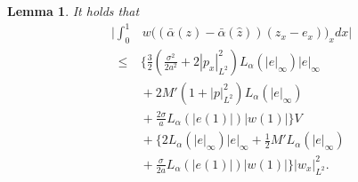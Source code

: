 \documentclass[twocolumn]{autart}
\newtheorem{lemm}{Lemma}
\newenvironment{lemma}{\begin{lemm}}{\hfill \end{lemm}}
\begin{document}
\begin{lemma}
It holds that 
\begin{align}
\bigg|\int_{0}^{1}&w\big(\left(\bar{\alpha}(z)-\bar{\alpha}(\hat{z})\right)(z_x-e_x)\big)_x dx\bigg| \nonumber 
\end{align}
\begin{align}
\leq&~ \bigg\{ \frac{3}{2}\left(\frac{\sigma^2}{2a^2}+2|p_x|_{L^2}^2\right)L_{\alpha}(|e|_{\infty})|e|_{\infty} \nonumber \\
&~+2M'\left(1+|p|_{L^2}^2\right)L_{\alpha}(|e|_{\infty}) \nonumber \\
&~+\frac{2\sigma}{a}L_{\alpha}(|e(1)|)|w(1)|\bigg\}V \nonumber \\
&~+\bigg\{2L_{\alpha}(|e|_{\infty})|e|_{\infty} +\frac{1}{2}M'L_{\alpha}(|e|_{\infty}) \nonumber \\
&~+\frac{\sigma}{2a}L_{\alpha}(|e(1)|)|w(1)|\bigg\}|w_x|_{L^2}^2. \label{F_B_1}
\end{align}
\hfill  
\end{lemma}
\end{document}
